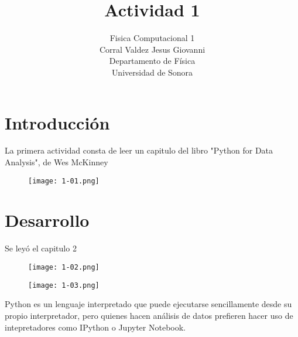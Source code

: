 \documentclass{article}
\title{Actividad 1}
\author{Fisica Computacional 1\\
Corral Valdez Jesus Giovanni\\
Departamento de Física\\
Universidad de Sonora}
\date{}
\begin{document}
\maketitle
\section{Introducción}
La primera actividad consta de leer un capitulo del libro "Python for Data Analysis", de Wes McKinney\\
\begin{figure}[h]
  \texttt{[image: 1-01.png]}
\end{figure}
\clearpage

\section{Desarrollo}
Se leyó el capitulo 2\\
\begin{figure}[h]
  \texttt{[image: 1-02.png]}
\end{figure}
\clearpage
\begin{figure}[h]
  \texttt{[image: 1-03.png]}
\end{figure}
Python es un lenguaje interpretado que puede ejecutarse sencillamente desde su propio interpretador, pero quienes hacen análisis de datos prefieren hacer uso de intepretadores como IPython o Jupyter Notebook.\\
\end{document}
